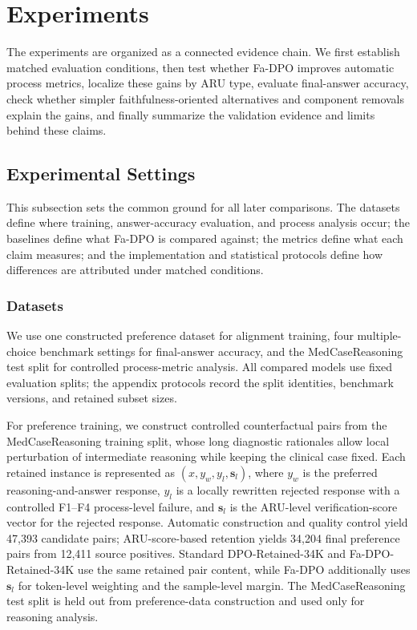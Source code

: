 \documentclass[a4paper,fleqn,doubleblind]{cas-sc}
\begin{document}
\section{Experiments}
\label{sec:experiments}

The experiments are organized as a connected evidence chain. We first establish matched evaluation conditions, then test whether Fa-DPO improves automatic process metrics, localize these gains by ARU type, evaluate final-answer accuracy, check whether simpler faithfulness-oriented alternatives and component removals explain the gains, and finally summarize the validation evidence and limits behind these claims.

\subsection{Experimental Settings}
\label{subsec:settings}

This subsection sets the common ground for all later comparisons. The datasets define where training, answer-accuracy evaluation, and process analysis occur; the baselines define what Fa-DPO is compared against; the metrics define what each claim measures; and the implementation and statistical protocols define how differences are attributed under matched conditions.

\subsubsection{Datasets}
\label{subsubsec:datasets}
We use one constructed preference dataset for alignment training, four multiple-choice benchmark settings for final-answer accuracy, and the MedCaseReasoning~\cite{wu2025medcasereasoning} test split for controlled process-metric analysis. All compared models use fixed evaluation splits; the appendix protocols record the split identities, benchmark versions, and retained subset sizes.

For preference training, we construct controlled counterfactual pairs from the MedCaseReasoning training split, whose long diagnostic rationales allow local perturbation of intermediate reasoning while keeping the clinical case fixed. Each retained instance is represented as $(x, y_w, y_l, \mathbf{s}_l)$, where $y_w$ is the preferred reasoning-and-answer response, $y_l$ is a locally rewritten rejected response with a controlled F1--F4 process-level failure, and $\mathbf{s}_l$ is the ARU-level verification-score vector for the rejected response. Automatic construction and quality control yield 47,393 candidate pairs; ARU-score-based retention yields 34,204 final preference pairs from 12,411 source positives. Standard DPO-Retained-34K and Fa-DPO-Retained-34K use the same retained pair content, while Fa-DPO additionally uses $\mathbf{s}_l$ for token-level weighting and the sample-level margin. The MedCaseReasoning test split is held out from preference-data construction and used only for reasoning analysis.
\end{document}
